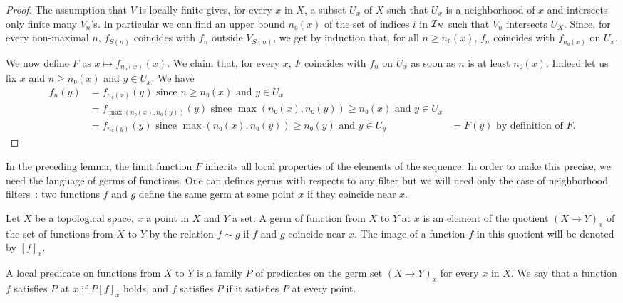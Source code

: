 \begin{proof}\leanok
  The assumption that $V$ is locally finite gives, for every $x$ in $X$, a
  subset $U_x$ of $X$ such that $U_x$ is a neighborhood of $x$ and intersects
  only finite many $V_n$'s. In particular we can find an upper bound $n₀(x)$ of the set
  of indices $i$ in $\mathcal{I}_{N}$ such that $V_n$ intersects $U_X$.
  Since, for every non-maximal $n$, $f_{S(n)}$ coincides with $f_n$ outside
  $V_{S(n)}$, we get by induction that, for all $n ≥ n₀(x)$, $f_n$ coincides
  with $f_{n₀(x)}$ on $U_x$.

  We now define $F$ as $x ↦ f_{n₀(x)}(x)$. We claim that, for every $x$,
  $F$ coincides with $f_n$ on $U_x$ as soon as $n$ is at least $n₀(x)$.
  Indeed let us fix $x$ and $n ≥ n₀(x)$ and $y ∈ U_x$. We have
  \begin{align*}
    f_n(y) &= f_{n₀(x)}(y) \text{ since $n ≥ n₀(x)$ and $y ∈ U_x$}\\
           &= f_{\max(n₀(x), n₀(y))}(y) \text{ since $\max(n₀(x), n₀(y)) ≥ n₀(x)$ and $y ∈ U_x$}\\
           &= f_{n₀(y)}(y) \text{ since $\max(n₀(x), n₀(y)) ≥ n₀(y)$ and $y ∈ U_y$}
           &= F(y) \text{ by definition of $F$}.
  \end{align*}
\end{proof}

In the preceding lemma, the limit function $F$ inherits all local properties of
the elements of the sequence. In order to make this precise, we need the
language of germs of functions. One can defines germs with respects to any filter but
we will need only the case of neighborhood filters~: two functions $f$ and $g$
define the same germ at some point $x$ if they coincide near $x$.

\begin{definition}\label{def:germ}\leanok
  Let $X$ be a topological space, $x$ a point in $X$ and $Y$ a set. A germ of function
  from $X$ to $Y$ at $x$ is an element of the quotient $(X → Y)_x$ of the set of functions
  from $X$ to $Y$ by the relation $f ∼ g$ if $f$ and $g$ coincide near $x$. The image
  of a function $f$ in this quotient will be denoted by $[f]_x$.

  A local predicate on functions from $X$ to $Y$ is a family $P$ of predicates on the
  germ set $(X → Y)_x$ for every $x$ in $X$. We say that a function $f$
  satisfies $P$ at $x$ if $P [f]_x$ holds, and $f$ satisfies $P$ if it
  satisfies $P$ at every point.
\end{definition}

